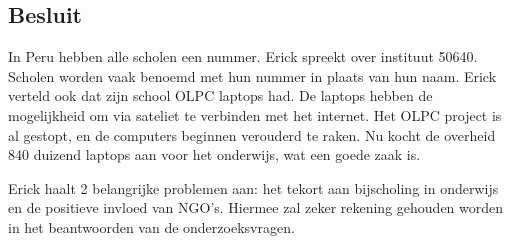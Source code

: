 \subsection{Besluit}
In Peru hebben alle scholen een nummer. Erick spreekt over instituut 50640. Scholen worden vaak benoemd met hun nummer in plaats van hun naam. Erick verteld ook dat zijn school OLPC laptops had. De laptops hebben de mogelijkheid om via sateliet te verbinden met het internet. Het OLPC project is al gestopt, en de computers beginnen verouderd te raken. Nu kocht de overheid 840 duizend laptops aan voor het onderwijs, wat een goede zaak is. \autocite{Riofrio2020}

Erick haalt 2 belangrijke problemen aan: het tekort aan bijscholing in onderwijs en de positieve invloed van NGO's. Hiermee zal zeker rekening gehouden worden in het beantwoorden van de onderzoeksvragen.